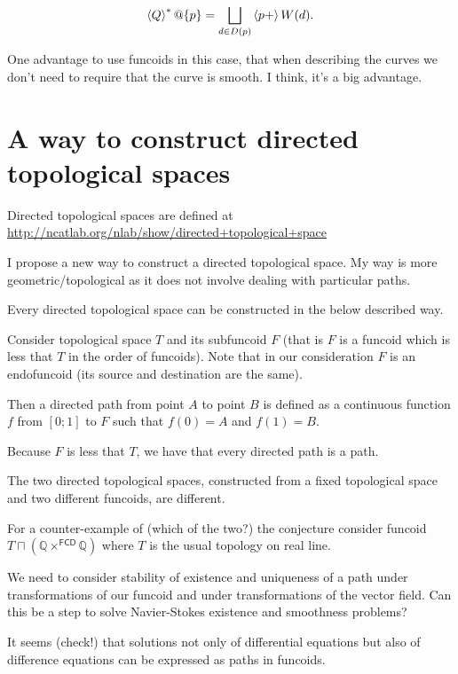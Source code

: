 \[ \left\langle Q\right\rangle ^{\ast}@\{p\} = \bigsqcup_{d\in D(p)} \left\langle p+\right\rangle W(d). \]

One advantage to use funcoids in this case, that when describing the curves we don't need to require that the curve is smooth. I think, it's a big advantage.

\section{A way to construct directed topological spaces}


Directed topological spaces are defined at\\
\url{http://ncatlab.org/nlab/show/directed+topological+space}

I propose a new way to construct a directed topological space. My way is more geometric/topological as it does not involve dealing with particular paths.

\begin{conjecture}
Every directed topological space can be constructed in the below described way.
\end{conjecture}

Consider topological space $T$ and its subfuncoid $F$ (that is $F$ is a funcoid which is less that $T$ in the order of funcoids).
Note that in our consideration $F$ is an endofuncoid (its source and destination are the same).

Then a directed path from point $A$ to point $B$ is defined as a continuous function $f$ from $[0;1]$ to $F$ such that $f(0)=A$ and $f(1)=B$.

Because $F$ is less that $T$, we have that every directed path is a path.

\begin{conjecture}
The two directed topological spaces, constructed from a fixed topological space and two different funcoids,
are different.
\end{conjecture}

For a counter-example of (which of the two?) the conjecture consider funcoid $T\sqcap(\mathbb{Q}\times^{\mathsf{FCD}}\mathbb{Q})$
where $T$ is the usual topology on real line.

We need to consider stability of existence and uniqueness of a path under transformations of our funcoid and
under transformations of the vector field. Can this be a step to solve Navier-Stokes existence and smoothness problems?

It seems (check!) that solutions not only of differential equations but also of difference equations can be
expressed as paths in funcoids.